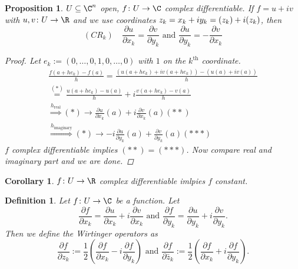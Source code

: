 \documentclass[A4paper, british]{amsart}
\theoremstyle{darkgreentheorem}
\newtheorem{prop}[thm]{Proposition}
\newtheorem{cor}[thm]{Corollary}
\theoremstyle{darkbluedefinition}
\newtheorem{defn}[thm]{Definition}
\theoremstyle{darkredexample}
\theoremstyle{remark}
\let\Re\relax
\DeclareMathOperator{\Re}{Re}
\let\Im\relax
\DeclareMathOperator{\Im}{Im}
\newcommand{\1}{\mathbbm{1}}
\begin{document}
\begin{prop}
    $U\subseteq \C^{n}$ open, $f\colon U\to \C$ complex differentiable.
    If $f=u+iv$ with $u,v\colon U\to \R$ and we use coordinates $z_{k}=x_{k}+iy_{k}=\Re(z_{k})+i\Im(z_{k})$, then
    \[ (CR_{k}) \quad \frac{\partial u}{\partial x_{k}}=\frac{\partial v}{\partial y_{k}} \text{ and } \frac{\partial u}{\partial y_{k}}=-\frac{\partial v}{\partial x_{k}} \]
    \begin{proof}
	Let $e_{k}:=(0,\ldots,0,1,0,\ldots,0)$ with $1$ on the $k^{\mathrm{th}}$ coordinate.
	\begin{multline*}
	    \frac{f(a+he_{k})-f(a)}{h}=\frac{(u(a+he_{k})+iv(a+he_{k}))-(u(a)+iv(a))}{h} \\
	    \overset{(*)}{=} \frac{u(a+he_{k})-u(a)}{h} + i\frac{v(a+he_{k})-v(a)}{h} \\
	    \overset{h_{\mathrm{real}}}{\Rightarrow } (*)\to \frac{\partial u}{\partial x_{k}}(a)+i\frac{\partial v}{\partial x_{k}}(a) (**) \\
	    \overset{h_{\mathrm{imaginary}}}{\Rightarrow } (*)\to -i\frac{\partial u}{\partial y_{k}}(a)+\frac{\partial v}{\partial y_{k}}(a) (***)
	\end{multline*}
	$f$ complex differentiable implies $(**)=(***)$.
	Now compare real and imaginary part and we are done.
    \end{proof}
\end{prop}

\begin{cor}
    $f\colon U\to \R$ complex differentiable imlpies $f$ constant.
\end{cor}

\begin{defn}
    Let $f\colon U\to \C$ be a function.
    Let
    \[ \frac{\partial f}{\partial x_{k}}=\frac{\partial u}{\partial x_{k}} + i\frac{\partial v}{\partial x_{k}} \text{ and } \frac{\partial f}{\partial y_{k}}=\frac{\partial u}{\partial y_{k}}+i\frac{\partial v}{\partial y_{k}}. \]
    Then we define the \textit{Wirtinger operators} as
    \[ \frac{\partial f}{\partial z_{k}}:=\frac{1}{2}\left( \frac{\partial f}{\partial x_{k}}-i\frac{\partial f}{\partial y_{k}} \right) \text{ and } \frac{\partial f}{\partial \bar{z}_{k}}:=\frac{1}{2}\left( \frac{\partial f}{\partial x_{k}}+i\frac{\partial f}{\partial y_{k}}\right).\]
\end{defn}
\end{document}
